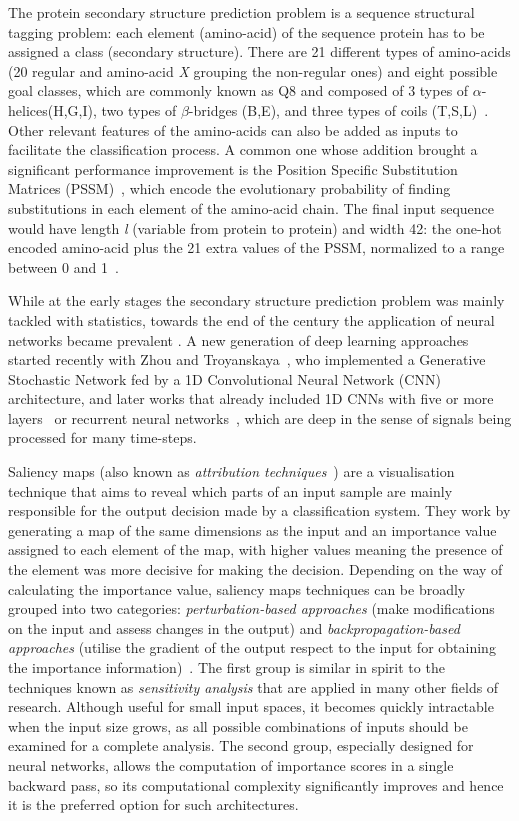\documentclass{article}
\begin{document}
The protein secondary structure prediction problem is a sequence structural tagging problem: each element (amino-acid) of the sequence protein has to be assigned a class (secondary structure). There are 21 different types of amino-acids (20 regular and amino-acid \textit{X} grouping the non-regular ones) and eight possible goal classes, which are commonly known as Q8 and composed of 3 types of $\alpha$-helices(H,G,I), two types of $\beta$-bridges (B,E), and three types of coils (T,S,L)~\cite{Kabsch1983}. Other relevant features of the amino-acids can also be added as inputs to facilitate the classification process. A common one whose addition brought a significant performance improvement is the Position Specific Substitution Matrices (PSSM)~\cite{Yang2018}, which encode the evolutionary probability of finding substitutions in each element of the amino-acid chain. The final input sequence would have length \textit{l} (variable from protein to protein) and width 42: the one-hot encoded amino-acid plus the 21 extra values of the PSSM, normalized to a range between 0 and 1~\cite{Busia2017}.

While at the early stages the secondary structure prediction problem was mainly tackled with statistics, towards the end of the century the application of neural networks became prevalent \cite{Rost1993}. A new generation of deep learning approaches started recently with Zhou and Troyanskaya~\cite{Zhou2014}, who implemented a Generative Stochastic Network fed by a 1D Convolutional Neural Network (CNN) architecture, and later works that already included 1D CNNs with five or more layers~\cite{Wang2016,Fang2017,Zhou2018} or recurrent neural networks~\cite{Li2016,Hattori2017,Jurtz2017}, which are deep in the sense of signals being processed for many time-steps.

Saliency maps (also known as \textit{attribution techniques}~\cite{Olah2017}) are a visualisation technique that aims to reveal which parts of an input sample are mainly responsible for the output decision made by a classification system. They work by generating a map of the same dimensions as the input and an importance value assigned to each element of the map, with higher values meaning the presence of the element was more decisive for making the decision. Depending on the way of calculating the importance value, saliency maps techniques can be broadly grouped into two categories: \textit{perturbation-based approaches} (make modifications on the input and assess changes in the output) and \textit{backpropagation-based approaches} (utilise the gradient of the output respect to the input for obtaining the importance information)~\cite{Shrikumar2017}. The first group is similar in spirit to the techniques known as \textit{sensitivity analysis} that are applied in many other fields of research. Although useful for small input spaces, it becomes quickly intractable when the input size grows, as all possible combinations of inputs should be examined for a complete analysis. The second group, especially designed for neural networks, allows the computation of importance scores in a single backward pass, so its computational complexity significantly improves and hence it is the preferred option for such architectures.
\end{document}
